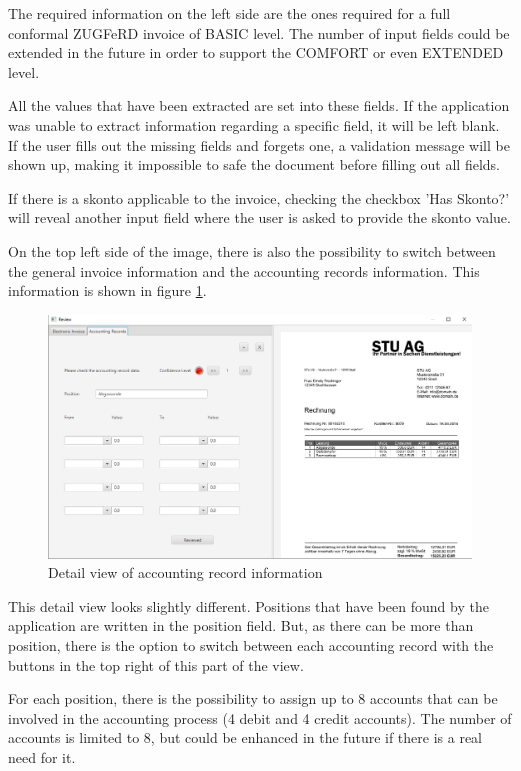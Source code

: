 The required information on the left side are the ones required for a full conformal ZUGFeRD invoice of BASIC level. The number of input fields could be extended in the future in order to support the COMFORT or even EXTENDED level.

All the values that have been extracted are set into these fields. If the application was unable to extract information regarding a specific field, it will be left blank. If the user fills out the missing fields and forgets one, a validation message will be shown up, making it impossible to safe the document before filling out all fields.

If there is a skonto applicable to the invoice, checking the checkbox 'Has Skonto?' will reveal another input field where the user is asked to provide the skonto value.

On the top left side of the image, there is also the possibility to switch between the general invoice information and the accounting records information. This information is shown in figure \ref{reviewAR}.

\begin{figure}[ht!]
\centering
\includegraphics[width=\textwidth]{Images/GUI/reviewAR.png}
\caption{Detail view of accounting record information \label{reviewAR}}
\end{figure}

This detail view looks slightly different. Positions that have been found by the application are written in the position field. But, as there can be more than position, there is the option to switch between each accounting record with the buttons in the top right of this part of the view.

For each position, there is the possibility to assign up to 8 accounts that can be involved in the accounting process (4 debit and 4 credit accounts). The number of accounts is limited to 8, but could be enhanced in the future if there is a real need for it.

